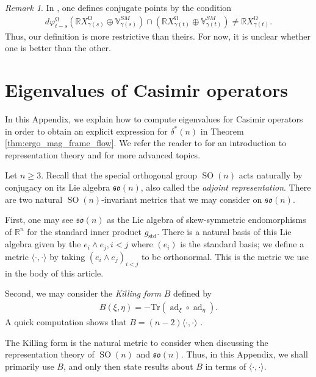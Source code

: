 \documentclass[12pt]{amsart}
\numberwithin{numbering}{section}
\theoremstyle{plain}
\theoremstyle{definition}
\theoremstyle{remark}
\newtheorem{rmq}[numbering]{Remark}
\numberwithin{equation}{section}
\DeclareMathOperator{\ad}{ad}
\DeclareMathOperator{\SO}{SO}
\DeclareMathOperator{\mg}{\Omega}
\newcommand{\R}{\mathbb{R}}
\newcommand{\frk}[1]{\mathfrak{#1}}
\begin{document}
\begin{rmq}
In \cite{assenza2025hopf}, one defines conjugate points by the condition 
\begin{align*}
d\varphi_{t-s}^{\mg} (\R X^{\mg}_{\gamma(s)} \oplus \mathbb{V}^{SM}_{\gamma(s)}) \cap (\R X^{\mg}_{\gamma(t)} \oplus \mathbb{V}^{SM}_{\gamma(t)}) \neq \R X^{\mg}_{\gamma(t)}.
\end{align*}
Thus, our definition is more restrictive than theirs. For now, it is unclear whether one is better than the other.
\end{rmq}


\section{Eigenvalues of Casimir operators} \label{sec:casimir}

In this Appendix, we explain how to compute eigenvalues for Casimir operators in order to obtain an explicit expression for $\delta^*(n)$ in Theorem \ref{thm:ergo_mag_frame_flow}. We refer the reader to \cite{sepanski2007compact, fulton2013representation} for an introduction to representation theory and \cite{knapp1996lie} for more advanced topics.

\medskip 

Let $n \geq 3$. Recall that the special orthogonal group $\SO(n)$ acts naturally by conjugacy on its Lie algebra $\frk{so}(n)$, also called the \emph{adjoint representation}. There are two natural $\SO(n)$-invariant metrics that we may consider on $\frk{so}(n)$. 

First, one may see $\frk{so}(n)$ as the Lie algebra of skew-symmetric endomorphisms of $\R^n$ for the standard inner product $g_{\mathrm{std}}$. There is a natural basis of this Lie algebra given by the $e_i \wedge e_j, i < j$ where $(e_i)$ is the standard basis; we define a metric $\langle \cdot, \cdot \rangle$ by taking $(e_i \wedge e_j)_{i < j}$ to be orthonormal. This is the metric we use in the body of this article.

Second, we may consider the \emph{Killing form} $B$ defined by 
\begin{align*}
B(\xi, \eta) = - \mathrm{Tr}(\ad_\xi \circ \ad_\eta).
\end{align*}
A quick computation shows that $B = (n-2) \langle \cdot, \cdot \rangle$ \cite[p. 272]{fulton2013representation}.

The Killing form is the natural metric to consider when discussing the representation theory of $\SO(n)$ and $\frk{so}(n)$. Thus, in this Appendix, we shall primarily use $B$, and only then state results about $B$ in terms of $\langle \cdot, \cdot \rangle$.
\end{document}
